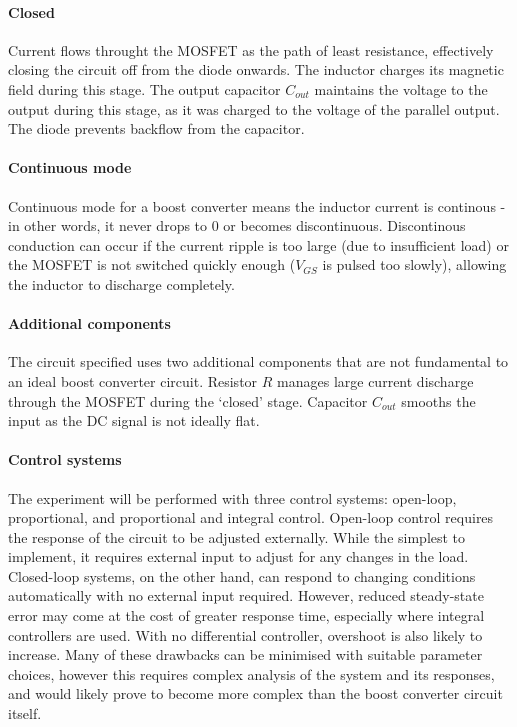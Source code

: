 \paragraph{Closed}
Current flows throught the MOSFET as the path of least resistance, effectively closing the circuit
off from the diode onwards. The inductor charges its magnetic field during this stage. The output capacitor $C_{out}$ maintains
the voltage to the output during this stage, as it was charged to the voltage of the parallel output.
The diode prevents backflow from the capacitor.

\paragraph{Continuous mode}
Continuous mode for a boost converter means the inductor current is continous - in other words, it never drops to 0 or becomes discontinuous.
Discontinous conduction can occur if the current ripple is too large (due to insufficient load) or the MOSFET is not
switched quickly enough ($V_{GS}$ is pulsed too slowly), allowing the inductor to discharge completely.

\paragraph{Additional components}
The circuit specified uses two additional components that are not fundamental to an ideal boost converter circuit.
Resistor $R$ manages large current discharge through the MOSFET during the `closed' stage. Capacitor $C_{out}$ smooths the input
as the DC signal is not ideally flat.

\paragraph{Control systems}
The experiment will be performed with three control systems: open-loop, proportional, and proportional and integral control. Open-loop control requires the response of the circuit to be adjusted externally.
While the simplest to implement, it requires external input to adjust for any changes in the load. Closed-loop systems, on the other hand, can respond to changing conditions
automatically with no external input required. However, reduced steady-state error may come at the cost of greater response time, especially
where integral controllers are used. With no differential controller, overshoot is also likely to increase. Many of these drawbacks can be minimised with suitable parameter choices,
however this requires complex analysis of the system and its responses, and would likely prove to become more complex than the boost converter circuit itself.

